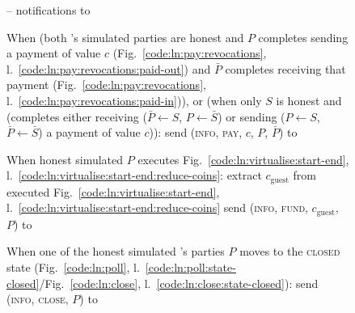\begin{figure}[H]
\begin{simulatorbox}{\simulator{} -- notifications to \fchan}
\begin{algorithmic}[1]
      \State When (both \fchan's simulated parties are honest and $P$ completes
      sending a payment of value $c$ (Fig.~\ref{code:ln:pay:revocations},
      l.~\ref{code:ln:pay:revocations:paid-out}) and $\bar{P}$ completes
      receiving that payment (Fig.~\ref{code:ln:pay:revocations},
      l.~\ref{code:ln:pay:revocations:paid-in})), or (when only $S$ is honest
      and (completes either receiving ($\bar{P} \gets S$, $P \gets \bar{S}$) or
      sending ($P \gets S$, $\bar{P} \gets \bar{S}$) a payment of value $c$)):
      \Indent
        \State send (\textsc{info}, \textsc{pay}, $c$, $P$, $\bar{P}$) to \fchan
      \EndIndent
      \Statex

      \State When honest simulated $P$ executes
      Fig.~\ref{code:ln:virtualise:start-end},
      l.~\ref{code:ln:virtualise:start-end:reduce-coins}: 
      \Indent
        \State extract $c_{\mathrm{guest}}$ from executed
        Fig.~\ref{code:ln:virtualise:start-end},
        l.~\ref{code:ln:virtualise:start-end:reduce-coins}
        \State send (\textsc{info}, \textsc{fund}, $c_{\mathrm{guest}}$, $P$) to
        \fchan
      \EndIndent
      \Statex

      \State When one of the honest simulated \fchan's parties $P$ moves to the
      \textsc{closed} state (Fig.~\ref{code:ln:poll},
      l.~\ref{code:ln:poll:state-closed}/Fig.~\ref{code:ln:close},
      l.~\ref{code:ln:close:state-closed}):
      \Indent
        \State send (\textsc{info}, \textsc{close}, $P$) to \fchan
      \EndIndent
    \end{algorithmic}
  \end{simulatorbox}
  \caption{}
  \label{code:simulator}
\end{figure}
